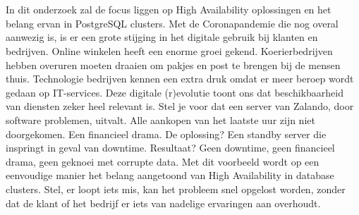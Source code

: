 \chapter{}
\label{ch:inleiding}



\section{}
\label{sec:probleemstelling}

In dit onderzoek zal de focus liggen op High Availability oplossingen en het belang ervan in PostgreSQL clusters. Met de Coronapandemie die nog overal aanwezig is, is er een grote stijging in het digitale gebruik bij klanten en bedrijven. Online winkelen heeft een enorme groei gekend. Koerierbedrijven hebben overuren moeten draaien om pakjes en post te brengen bij de mensen thuis. Technologie bedrijven kennen een extra druk omdat er meer beroep wordt gedaan op IT-services. Deze digitale (r)evolutie toont ons dat beschikbaarheid van diensten zeker heel relevant is. Stel je voor dat een server van Zalando, door software problemen, uitvalt. Alle aankopen van het laatste uur zijn niet doorgekomen. Een financieel drama. De oplossing? Een standby server die inspringt in geval van downtime. Resultaat? Geen downtime, geen financieel drama, geen geknoei met corrupte data. Met dit voorbeeld wordt op een eenvoudige manier het belang aangetoond van High Availability in database clusters. Stel, er loopt iets mis, kan het probleem snel opgelost worden, zonder dat de klant of het bedrijf er iets van nadelige ervaringen aan overhoudt.

